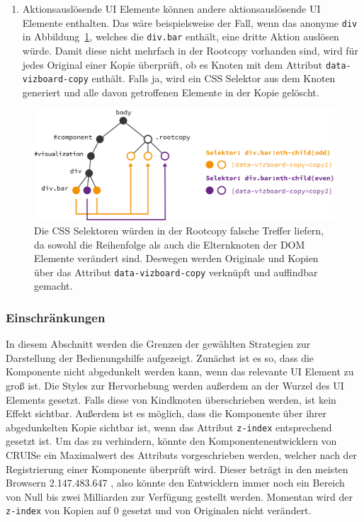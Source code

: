 \documentclass[
	headsepline,
	footsepline,
	fontsize=12pt,
	bibliography=totoc
]{scrbook}
\begin{document}
\begin{enumerate}
	\item Aktionsauslösende UI Elemente können andere aktionsauslösende UI Elemente enthalten. Das wäre beispielsweise der Fall, wenn das anonyme \texttt{div} in Abbildung~\ref{figure:rootcopy}, welches die \texttt{div.bar} enthält, eine dritte Aktion auslösen würde. Damit diese nicht mehrfach in der Rootcopy vorhanden sind, wird für jedes Original einer Kopie überprüft, ob es Knoten mit dem Attribut \texttt{data-vizboard-copy} enthält. Falls ja, wird ein CSS Selektor aus dem Knoten generiert und alle davon getroffenen Elemente in der Kopie gelöscht.
\end{enumerate}

\begin{figure}[htbp]
   \centering
   \includegraphics[width=\textwidth]{images/implementierung-rootcopy.png}
   \caption{Die CSS Selektoren würden in der Rootcopy falsche Treffer liefern, da sowohl die Reihenfolge als auch die Elternknoten der DOM Elemente verändert sind. Deswegen werden Originale und Kopien über das Attribut \texttt{data-vizboard-copy} verknüpft und auffindbar gemacht.}
   \label{figure:rootcopy}
\end{figure}

\subsubsection{Einschränkungen}


In diesem Abschnitt werden die Grenzen der gewählten Strategien zur Darstellung der Bedienungshilfe aufgezeigt. Zunächst ist es so, dass die Komponente nicht abgedunkelt werden kann, wenn das relevante UI Element zu groß ist. Die Styles zur Hervorhebung werden außerdem an der Wurzel des UI Elements gesetzt. Falls diese von Kindknoten überschrieben werden, ist kein Effekt sichtbar. Außerdem ist es möglich, dass die Komponente über ihrer abgedunkelten Kopie sichtbar ist, wenn das Attribut \texttt{z-index} entsprechend gesetzt ist. Um das zu verhindern, könnte den Komponentenentwicklern von CRUISe ein Maximalwert des Attributs vorgeschrieben werden, welcher nach der Registrierung einer Komponente überprüft wird. Dieser beträgt in den meisten Browsern 2.147.483.647 \cite{Puidokas2009}, also könnte den Entwicklern immer noch ein Bereich von Null bis zwei Milliarden zur Verfügung gestellt werden. Momentan wird der \texttt{z-index} von Kopien auf 0 gesetzt und von Originalen nicht verändert.
\end{document}
